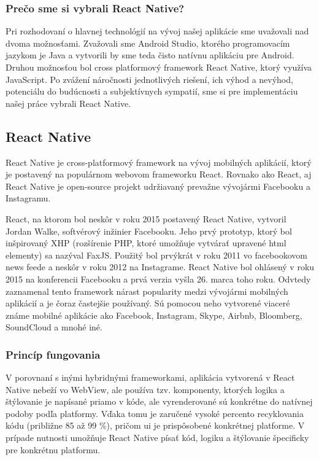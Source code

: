 \subsubsection{Prečo sme si vybrali React Native?}
Pri rozhodovaní o hlavnej technológií na vývoj našej aplikácie sme uvažovali nad dvoma možnosťami. Zvažovali sme Android Studio, ktorého programovacím jazykom je Java a vytvorili by sme teda čisto natívnu aplikáciu pre Android. Druhou možnosťou bol cross platformový framework React Native, ktorý využíva JavaScript. Po zvážení náročnosti jednotlivých riešení, ich výhod a nevýhod, potenciálu do budúcnosti a subjektívnych sympatií, sme si pre implementáciu našej práce vybrali React Native. \\

\subsection{React Native}
\label{sec:React Native}

React Native je cross-platformový framework na vývoj mobilných aplikácií, ktorý je postavený na populárnom webovom frameworku React. Rovnako ako React, aj React Native je open-source projekt udržiavaný prevažne vývojármi Facebooku a Instagramu.

React, na ktorom bol neskôr v roku 2015 postavený React Native, vytvoril Jordan Walke, softvérový inžinier Facebooku. Jeho prvý prototyp, ktorý bol inšpirovaný XHP (rozšírenie PHP, ktoré umožňuje vytvárať upravené \acrshort{html} elementy) sa nazýval FaxJS. Použitý bol prvýkrát v roku 2011 vo facebookovom news feede a neskôr v roku 2012 na Instagrame. \cite{rn2} React Native bol ohlásený v roku 2015 na konferencii Facebooku a prvá verzia vyšla 26. marca toho roku. Odvtedy zaznamenal tento framework nárast popularity medzi vývojármi mobilných aplikácií a je čoraz častejšie používaný. Sú pomocou neho vytvorené viaceré známe mobilné aplikácie ako Facebook, Instagram, Skype, Airbnb, Bloomberg, SoundCloud a mnohé iné. \\
\subsubsection{Princíp fungovania}
V porovnaní s inými hybridnými frameworkami, aplikácia vytvorená v React Native nebeží vo WebView, ale používa tzv. komponenty, ktorých logika a štýlovanie je napísané priamo v kóde, ale vyrenderované sú konkrétne do natívnej podoby podľa platformy. Vďaka tomu je zaručené vysoké percento recyklovania kódu (približne 85 až 99 \%), pričom \acrshort{ui} je prispôsobené konkrétnej platforme. V prípade nutnosti umožňuje React Native písať kód, logiku a štýlovanie špecificky pre konkrétnu platformu. \\
